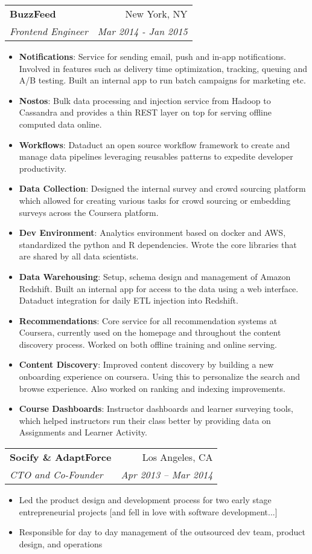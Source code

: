 \documentclass[letterpaper,11pt]{article}
\makeatletter
\newcommand{\resumeItem}[2]{
  \item\small{
    \textbf{#1}{: #2 \vspace{-2pt}}
  }
}
\newcommand{\resumeItemSimple}[1]{
  \item\small{
    {#1 \vspace{-2pt}}
  }
}
\newcommand{\resumeSubheading}[4]{
  \vspace{-1pt}\item
    \begin{tabular*}{0.97\textwidth}[t]{l@{\extracolsep{\fill}}r}
      \textbf{#1} & #2 \\
      \textit{\small#3} & \textit{\small #4} \\
    \end{tabular*}\vspace{-5pt}
}
\newcommand{\resumeItemListStart}{\begin{itemize}}
\newcommand{\resumeItemListEnd}{\end{itemize}\vspace{-5pt}}
\makeatother
\begin{document}
    \resumeSubheading
      {BuzzFeed}{New York, NY}
      {Frontend Engineer}{Mar 2014 - Jan 2015}
      \resumeItemListStart
        \resumeItem{Notifications}
          {Service for sending email, push and in-app notifications. Involved in features such as delivery time optimization, tracking, queuing and A/B testing. Built an internal app to run batch campaigns for marketing etc.}
        \resumeItem{Nostos}
          {Bulk data processing and injection service from Hadoop to Cassandra and provides a thin REST layer on top for serving offline computed data online.}
        \resumeItem{Workflows}
          {Dataduct an open source workflow framework to create and manage data pipelines leveraging reusables patterns to expedite developer productivity.}
        \resumeItem{Data Collection}
          {Designed the internal survey and crowd sourcing platform which allowed for creating various tasks for crowd sourcing or embedding surveys across the Coursera platform.}
        \resumeItem{Dev Environment}
          {Analytics environment based on docker and AWS, standardized the python and R dependencies. Wrote the core libraries that are shared by all data scientists.}
        \resumeItem{Data Warehousing}
          {Setup, schema design and management of Amazon Redshift. Built an internal app for access to the data using a web interface. Dataduct integration for daily ETL injection into Redshift.}
        \resumeItem{Recommendations}
          {Core service for all recommendation systems at Coursera, currently used on the homepage and throughout the content discovery process. Worked on both offline training and online serving.}
        \resumeItem{Content Discovery}
          {Improved content discovery by building a new onboarding experience on coursera. Using this to personalize the search and browse experience. Also worked on ranking and indexing improvements.}
        \resumeItem{Course Dashboards}
          {Instructor dashboards and learner surveying tools, which helped instructors run their class better by providing data on Assignments and Learner Activity.}
      \resumeItemListEnd
      
    \resumeSubheading
      {Socify \& AdaptForce}{Los Angeles, CA}
      {CTO and Co-Founder}{Apr 2013 – Mar 2014}
      \resumeItemListStart
        \resumeItemSimple
          {Led the product design and development process for two early stage entrepreneurial projects [and fell in love with software development...]}
        \resumeItemSimple
          {Responsible for day to day management of the outsourced dev team, product design, and operations}
      \resumeItemListEnd
\end{document}

